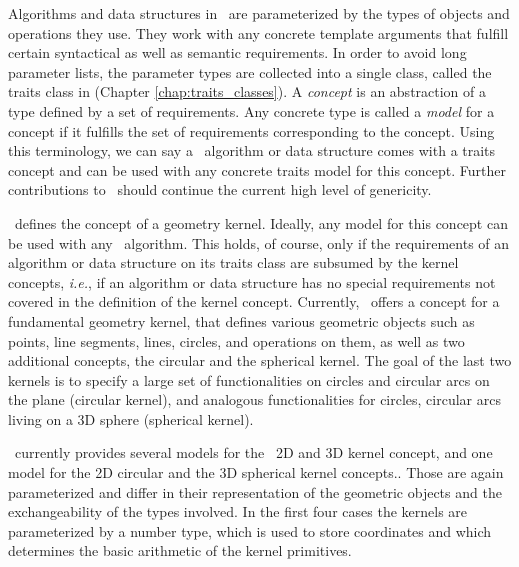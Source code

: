 Algorithms and data structures in \cgal\ are parameterized by the 
types of objects and operations they use. They work with any concrete 
template arguments that fulfill certain syntactical as well as semantic
requirements. In order to avoid long parameter lists,
the parameter types are collected into a single class, called the
traits class in \cgal{}
(Chapter \ref{chap:traits_classes}).
A {\em concept} is an abstraction of a type 
defined by a set of requirements.
Any concrete type is called a {\em model} for a 
concept if it fulfills
the set of requirements corresponding to the concept. Using this terminology,
we can say a \cgal\ algorithm or data structure comes with a traits 
concept and can be used with any concrete traits model for this concept.
Further contributions to \cgal\ should continue the current high
level of genericity. 

\cgal\ defines the concept of a geometry kernel.%
Ideally, any
model for this concept can be used with any \cgal\ algorithm. This holds, 
of course, only if the requirements of an algorithm or data structure on its
traits class are subsumed by the kernel concepts, {\em i.e.}, if an
algorithm or data structure has no special requirements 
not covered in the definition of the kernel concept. Currently, \cgal\
offers a concept for a fundamental geometry kernel, that defines
various geometric objects such as points, line segments, lines,
circles, and operations on them, as well as two additional concepts,
the circular and the spherical kernel. The goal of the last two
kernels is to specify a large set of functionalities on circles and
circular arcs on the plane (circular kernel), and analogous
functionalities for circles, circular arcs living on a 3D sphere
(spherical kernel).

\cgal\ currently provides several models for the \cgal\ 2D and 3D kernel
concept, and one model for the 2D circular and the 3D spherical kernel
concepts.. Those are again parameterized and differ in their 
representation of the geometric objects and the exchangeability of
the types involved. 
In the first four cases the kernels are parameterized by a number type, which
is used to store coordinates and which determines the basic arithmetic
of the kernel primitives.

